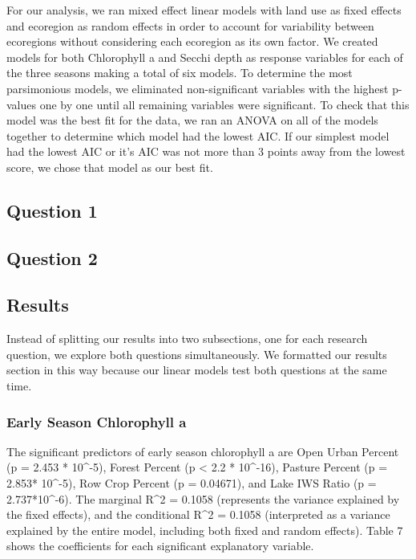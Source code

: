 \documentclass[12pt,]{article}
\begin{document}
For our analysis, we ran mixed effect linear models with land use as
fixed effects and ecoregion as random effects in order to account for
variability between ecoregions without considering each ecoregion as its
own factor. We created models for both Chlorophyll a and Secchi depth as
response variables for each of the three seasons making a total of six
models. To determine the most parsimonious models, we eliminated
non-significant variables with the highest p-values one by one until all
remaining variables were significant. To check that this model was the
best fit for the data, we ran an ANOVA on all of the models together to
determine which model had the lowest AIC. If our simplest model had the
lowest AIC or it's AIC was not more than 3 points away from the lowest
score, we chose that model as our best fit.

\hypertarget{question-1}{%
\subsection{Question 1 }\label{question-1}}

\hypertarget{question-2}{%
\subsection{Question 2}\label{question-2}}

\hypertarget{results}{%
\subsection{Results}\label{results}}

Instead of splitting our results into two subsections, one for each
research question, we explore both questions simultaneously. We
formatted our results section in this way because our linear models test
both questions at the same time.

\hypertarget{early-season-chlorophyll-a}{%
\subsubsection{Early Season Chlorophyll
a}\label{early-season-chlorophyll-a}}

The significant predictors of early season chlorophyll a are Open Urban
Percent (p = 2.453 * 10\^{}-5), Forest Percent (p \textless{} 2.2 *
10\^{}-16), Pasture Percent (p = 2.853* 10\^{}-5), Row Crop Percent (p =
0.04671), and Lake IWS Ratio (p = 2.737*10\^{}-6). The marginal R\^{}2 =
0.1058 (represents the variance explained by the fixed effects), and the
conditional R\^{}2 = 0.1058 (interpreted as a variance explained by the
entire model, including both fixed and random effects). Table 7 shows
the coefficients for each significant explanatory variable.
\end{document}
